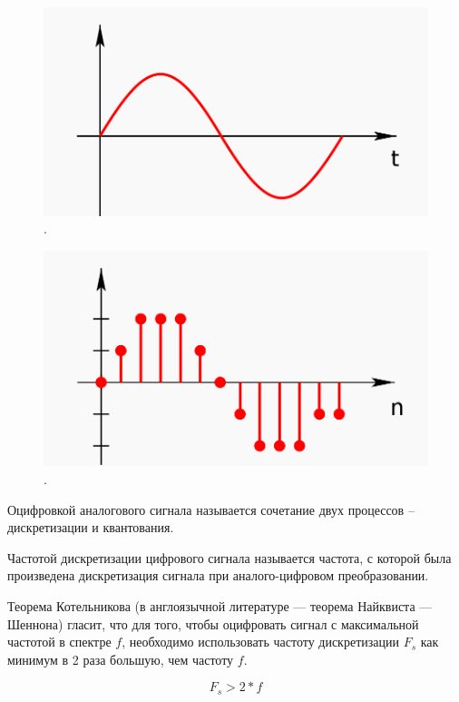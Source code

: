 \begin{figure}[H]
	\centering
	\includegraphics [width=1\textwidth] {images/lab_7/analog.png}
	\caption{.}
	\label{lab7:pic2}
\end{figure}


\begin{figure}[H]
	\centering
	\includegraphics [width=1\textwidth] {images/lab_7/digital.png}
	\caption{.}
	\label{lab7:pic3}
\end{figure}

Оцифровкой аналогового сигнала называется сочетание двух процессов -- дискретизации и квантования.

Частотой дискретизации цифрового сигнала называется частота, с которой была произведена дискретизация сигнала при аналого-цифровом преобразовании.

Теорема Котельникова (в англоязычной литературе — теорема Найквиста — Шеннона) гласит, что для того, чтобы оцифровать сигнал с максимальной частотой в спектре $f$, необходимо использовать частоту дискретизации $F_s$ как минимум в 2 раза большую, чем частоту $f$.

$$ F_s > 2*f $$

